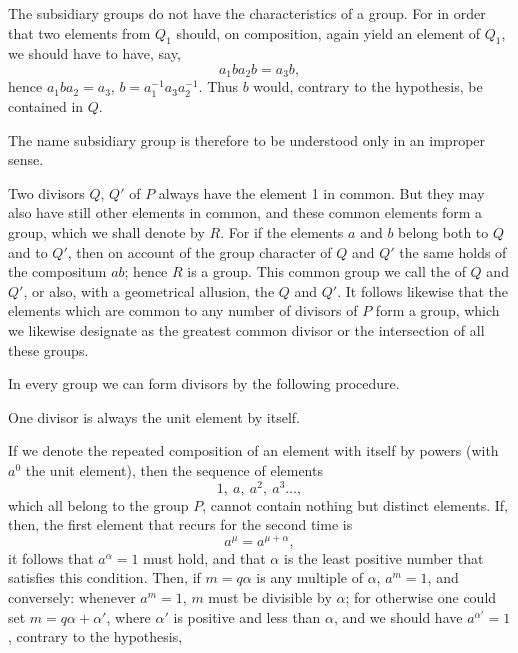 
The subsidiary groups do not have the characteristics of a group. For in
order that two elements from $Q_1$ should, on composition, again yield an
element of $Q_1$, we should have to have, say,
\[
a_1 b a_2 b = a_3 b,
\]
hence $a_1 b a_2 = a_3$, $b = a_1^{-1} a_3 a_2^{-1}$. Thus $b$ would,
contrary to the hypothesis, be contained in $Q$.

The name subsidiary group is therefore to be understood only in an
improper sense.

Two divisors $Q$, $Q'$ of $P$ always have the element 1 in common. But
they may also have still other elements in common, and these common
elements form a group, which we shall denote by $R$. For if the elements
$a$ and $b$ belong both to $Q$ and to $Q'$, then on account of the group
character of $Q$ and $Q'$ the same holds of the compositum $ab$; hence $R$
is a group. This common group we call the  of $Q$
and $Q'$, or also, with a geometrical allusion, the  $Q$
and $Q'$. It follows likewise that the elements which are common to any
number of divisors of $P$ form a group, which we likewise designate as the
greatest common divisor or the intersection of all these groups.

In every group we can form divisors by the following procedure.

One divisor is always the unit element by itself.

If we denote the repeated composition of an element with itself by powers
(with $a^0$ the unit element), then the sequence of elements
\[
1,\ a,\ a^2,\ a^3 \ldots,
\]
which all belong to the group $P$, cannot contain nothing but distinct
elements. If, then, the first element that recurs for the second time is
\[
a^\mu = a^{\mu+\alpha},
\]
it follows that $a^\alpha = 1$ must hold, and that $\alpha$ is the least
positive number that satisfies this condition. Then, if $m = q\alpha$ is
any multiple of $\alpha$, $a^m = 1$, and conversely: whenever $a^m = 1$,
$m$ must be divisible by $\alpha$; for otherwise one could set
$m = q\alpha + \alpha'$, where $\alpha'$ is positive and less than
$\alpha$, and we should have $a^{\alpha'} = 1$, contrary to the
hypothesis,
